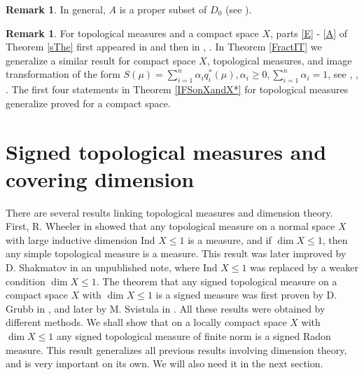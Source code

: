 \documentclass[sn-mathphys-num]{sn-jnl}%
\theoremstyle{thmstyleone}%
\theoremstyle{definition}
\newtheorem{remark}[theorem]{Remark}
\begin{document}
\begin{remark}
In general, $A$ is a proper subset of $D_0$ (see \cite[Rem. 5.7]{Aarnes:ITfirst}).
\end{remark}

\begin{remark}
For topological measures and a compact space $X$, 
parts \ref{E} - \ref{A} of Theorem \ref{sThe} first appeared in 
\cite[Pr. 5.2]{Aarnes:ITfirst}  and then in \cite[Pr. 5.8]{Pedersen}, \cite[Pr. 36]{AarnesJohansenRustad}.  
In Theorem \ref{FractIT} we generalize a similar result for compact space $X$, topological measures, and image transformation of the form
$S(\mu) = \sum_{i=1}^n \alpha_i q_i^* (\mu),\alpha_i \ge 0, \sum_{i=1}^n \alpha_i = 1$, see
\cite[Pr. 5.3]{Aarnes:ITfirst},  \cite[Pr. 5.13]{Pedersen}, \cite[Pr. 44]{AarnesJohansenRustad}. 
The first four statements in Theorem \ref{IFSonXandX*} 
for topological measures generalize \cite[Th. 5.5]{Aarnes:ITfirst} proved for a compact space. 
\end{remark}

\section{Signed topological measures and covering dimension} \label{SectDimSTM}

There are several results linking topological measures and dimension theory. First, R. Wheeler in \cite{Wheeler}  showed that 
any topological measure on a normal space $X$ with large inductive dimension $ \text{Ind } X \le 1$ is a measure, 
and if $\dim X \le 1$, then any simple topological measure is a measure.  
This result was later improved by D. Shakmatov in an unpublished note, where $ \text{Ind } X \le 1$ was replaced by a weaker condition  $ \dim X \le 1$.
The theorem that any signed topological measure on a compact space $X$ with $ \dim X \le 1$ is a signed measure 
was first proven by D. Grubb in \cite{Grubb:SignedqmDimTheory}, and later by M. Svistula  in \cite{Svistula:Signed}.  
All these results were obtained by different methods. 
We shall show that on a locally compact space $X$ with $ \dim X \le 1$ 
any signed topological measure of finite norm is a signed Radon measure. 
This result generalizes all previous results involving dimension theory, and 
is very important on its own. We will also need it in the next section.
\end{document}
